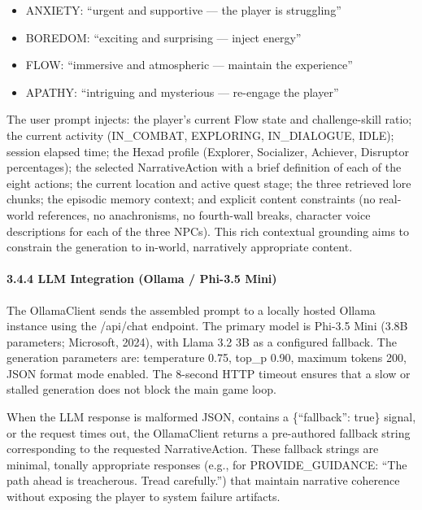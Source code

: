 \begin{itemize}
\tightlist
\item
  ANXIETY: ``urgent and supportive --- the player is struggling''
\item
  BOREDOM: ``exciting and surprising --- inject energy''
\item
  FLOW: ``immersive and atmospheric --- maintain the experience''
\item
  APATHY: ``intriguing and mysterious --- re-engage the player''
\end{itemize}

The user prompt injects: the player's current Flow state and
challenge-skill ratio; the current activity (IN\_COMBAT, EXPLORING,
IN\_DIALOGUE, IDLE); session elapsed time; the Hexad profile (Explorer,
Socializer, Achiever, Disruptor percentages); the selected
NarrativeAction with a brief definition of each of the eight actions;
the current location and active quest stage; the three retrieved lore
chunks; the episodic memory context; and explicit content constraints
(no real-world references, no anachronisms, no fourth-wall breaks,
character voice descriptions for each of the three NPCs). This rich
contextual grounding aims to constrain the generation to in-world,
narratively appropriate content.

\paragraph{3.4.4 LLM Integration (Ollama / Phi-3.5
Mini)}\label{llm-integration-ollama-phi-3.5-mini}

The OllamaClient sends the assembled prompt to a locally hosted Ollama
instance using the /api/chat endpoint. The primary model is Phi-3.5 Mini
(3.8B parameters; Microsoft, 2024), with Llama 3.2 3B as a configured
fallback. The generation parameters are: temperature 0.75, top\_p 0.90,
maximum tokens 200, JSON format mode enabled. The 8-second HTTP timeout
ensures that a slow or stalled generation does not block the main game
loop.

When the LLM response is malformed JSON, contains a \{``fallback'':
true\} signal, or the request times out, the OllamaClient returns a
pre-authored fallback string corresponding to the requested
NarrativeAction. These fallback strings are minimal, tonally appropriate
responses (e.g., for PROVIDE\_GUIDANCE: ``The path ahead is treacherous.
Tread carefully.'') that maintain narrative coherence without exposing
the player to system failure artifacts.

